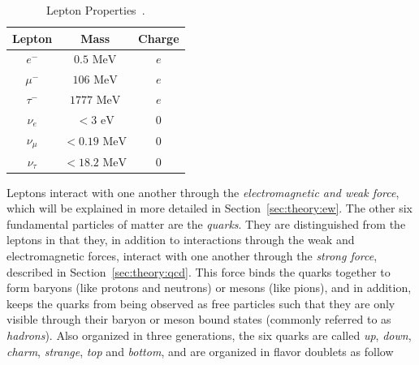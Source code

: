 \begin{table}[h!]
\begin{center}
\begin{tabular}{|c|c|c|}%
\hline
Lepton        & Mass           & Charge \\%
\hline
$e^{-}$      & $0.5 \mbox{ MeV}$      & $e$ \\%
$\mu^{-}$    & $106 \mbox{ MeV}$      & $e$ \\%
$\tau^{-}$   & $1777 \mbox{ MeV}$     & $e$ \\%
\hline                                      
$\nu_{e}$    & $< 3 \mbox{ eV}$       & $0$ \\%
$\nu_{\mu}$  & $< 0.19 \mbox{ MeV}$   & $0$ \\%
$\nu_{\tau}$ & $< 18.2 \mbox{ MeV}$   & $0$  \\%
\hline
\end{tabular}
\end{center}
\caption{Lepton Properties~\cite{Patrignani:2016xqp}.}
\label{table:theory:lepprop}
\end{table}
Leptons interact with one another through the \emph{electromagnetic and weak force}, which will be explained in more detailed in Section~\ref{sec:theory:ew}.\newline
The other six fundamental particles of matter are the \emph{quarks}. They are distinguished from the leptons in that they, in addition to interactions through the weak and electromagnetic forces, interact with one another through the \emph{strong force}, described in Section~\ref{sec:theory:qcd}. This force binds the quarks together to form baryons (like protons and neutrons) or mesons (like pions), and in addition, keeps the quarks from being observed as free particles such that they are only visible through their baryon or meson bound states (commonly referred to as \emph{hadrons}). Also organized in three generations, the six quarks are called \textit{up}, \textit{down}, \textit{charm}, \textit{strange}, \textit{top} and \textit{bottom}, and are organized in flavor doublets as follow
